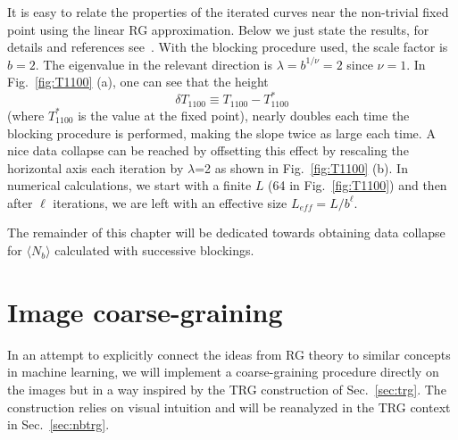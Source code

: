 \documentclass[../main.tex]{subfiles}
\begin{document}
%
It is easy to relate the properties of the iterated curves near the non-trivial
fixed point using the linear RG approximation.  Below we just state the
results, for details and references see~\cite{prb87}.  With the blocking
procedure used, the scale factor is $b=2$. The eigenvalue in the relevant
direction is $\lambda=b^{1/\nu}=2$ since $\nu=1$. In Fig.~\ref{fig:T1100} (a),
one can see that the height
%
\begin{equation}
    \delta T_{1100} \equiv T_{1100} - T_{1100}^{*}
\end{equation}
%
(where $T_{1100}^{*}$ is the value at the fixed point), nearly doubles each
time the blocking procedure is performed, making the slope twice as large each
time.
A nice data collapse can be reached by offsetting this effect by rescaling the
horizontal axis each iteration by $\lambda$=2 as shown in Fig.~\ref{fig:T1100}
(b). In numerical calculations, we start with a finite $L$ (64 in
Fig.~\ref{fig:T1100}) and then after $\ell$ iterations, we are left with an
effective size $L_{eff}=L/b^\ell$. 

The remainder of this chapter will be dedicated towards obtaining data collapse for $\langle N_b \rangle$ calculated with
successive blockings.

\section{Image coarse-graining}%
\label{sec:rgimages}
In an attempt to explicitly connect the ideas from RG theory to similar
concepts in machine learning, we will implement a coarse-graining procedure
directly on the images but in a way inspired by the TRG construction of
Sec.~\ref{sec:trg}.  The construction relies on visual intuition and will be
reanalyzed in the TRG context in Sec.~\ref{sec:nbtrg}.
\end{document}
